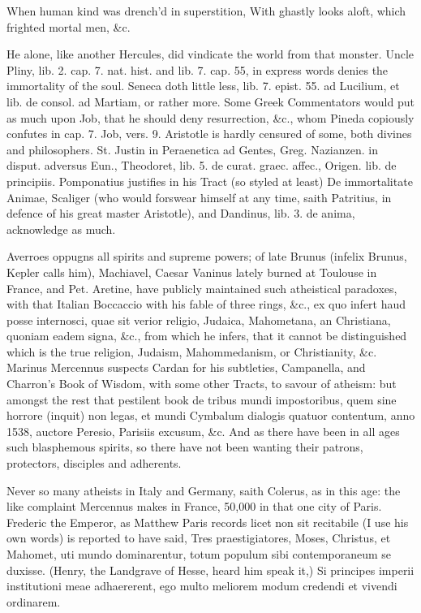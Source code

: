 {When human kind was drench'd in superstition,
With ghastly looks aloft, which frighted mortal men, \&c.

He alone, like another Hercules, did vindicate the world from that
monster. Uncle Pliny, lib. 2. cap. 7. nat. hist. and lib. 7. cap.
55, in express words denies the immortality of the soul. Seneca
doth little less, lib. 7. epist. 55. ad Lucilium, et lib. de consol. ad
Martiam, or rather more. Some Greek Commentators would put as much upon
Job, that he should deny resurrection, \&c., whom Pineda copiously
confutes in cap. 7. Job, vers. 9. Aristotle is hardly censured of some,
both divines and philosophers. St. Justin in Peraenetica ad Gentes,
Greg. Nazianzen. in disput. adversus Eun., Theodoret, lib. 5. de curat.
graec. affec., Origen. lib. de principiis. Pomponatius justifies in his
Tract (so styled at least) De immortalitate Animae, Scaliger (who would
forswear himself at any time, saith Patritius, in defence of his great
master Aristotle), and Dandinus, lib. 3. de anima, acknowledge as much.

Averroes oppugns all spirits and supreme powers; of late Brunus
(infelix Brunus, Kepler calls him), Machiavel, Caesar Vaninus
lately burned at Toulouse in France, and Pet. Aretine, have publicly
maintained such atheistical paradoxes, with that Italian
Boccaccio with his fable of three rings, \&c., ex quo infert haud posse
internosci, quae sit verior religio, Judaica, Mahometana, an
Christiana, quoniam eadem signa, \&c., from which he infers, that it
cannot be distinguished which is the true religion, Judaism,
Mahommedanism, or Christianity, \&c. Marinus Mercennus suspects
Cardan for his subtleties, Campanella, and Charron's Book of Wisdom,
with some other Tracts, to savour of atheism: but amongst the
rest that pestilent book de tribus mundi impostoribus, quem sine
horrore (inquit) non legas, et mundi Cymbalum dialogis quatuor
contentum, anno 1538, auctore Peresio, Parisiis excusum, \&c. And
as there have been in all ages such blasphemous spirits, so there have
not been wanting their patrons, protectors, disciples and adherents.

Never so many atheists in Italy and Germany, saith Colerus, as in
this age: the like complaint Mercennus makes in France, 50,000 in that
one city of Paris. Frederic the Emperor, as Matthew Paris records
licet non sit recitabile (I use his own words) is reported to have
said, Tres praestigiatores, Moses, Christus, et Mahomet, uti mundo
dominarentur, totum populum sibi contemporaneum se duxisse. (Henry, the
Landgrave of Hesse, heard him speak it,) Si principes imperii
institutioni meae adhaererent, ego multo meliorem modum credendi et
vivendi ordinarem.

}
